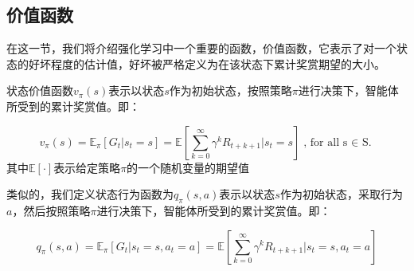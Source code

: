 \documentclass{standalone}
\begin{document}
\subsection{价值函数}
在这一节，我们将介绍强化学习中一个重要的函数，价值函数，它表示了对一个状态的好坏程度的估计值，好坏被严格定义为在该状态下累计奖赏期望的大小。\par
状态价值函数$v_{\pi}(s)$表示以状态$s$作为初始状态，按照策略$\pi$进行决策下，智能体所受到的累计奖赏值。即：
\begin{center}
    \begin{equation}
        v_{\pi}(s) = \mathbb{E}_{\pi}[G_t|s_t=s] = \mathbb{E}[\sum_{k=0}^{\infty}{\gamma^k{R_{t+k+1}}}|s_t=s]
        \mbox{, for all s $\in$ S.}
    \end{equation}
    \mbox{其中$\mathbb{E[\cdot]}$表示给定策略$\pi$的一个随机变量的期望值}
\end{center}
\par
类似的，我们定义状态行为函数为$q_{\pi}(s,a)$表示以状态$s$作为初始状态，采取行为$a$，然后按照策略$\pi$进行决策下，智能体所受到的累计奖赏值。即：
\begin{center}
    \begin{equation}
        q_{\pi}(s,a) = \mathbb{E}_{\pi}[G_t|s_t=s, a_t=a] = \mathbb{E}[\sum_{k=0}^{\infty}{\gamma^k{R_{t+k+1}}}|s_t=s, a_t=a]
    \end{equation}
    
\end{center}
\end{document}
